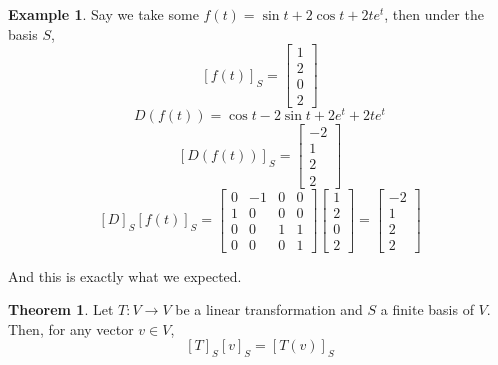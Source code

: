 \documentclass{report}
\theoremstyle{definition}
\newtheorem{_thm}{Theorem}[section]
\newtheorem{ex}{Example}[section]
\theoremstyle{remark}
\begin{document}
\begin{ex}
Say we take some $f(t)=\sin t+2\cos t+2te^t$, then under the basis $S$,
\[
[f(t)]_S=\begin{bmatrix}
1 \\ 2 \\ 0 \\ 2
\end{bmatrix}
\]
\[
D(f(t))=\cos t-2\sin t+2e^t+2te^t
\]
\[
[D(f(t))]_S=\begin{bmatrix}
-2 \\ 1 \\ 2 \\ 2
\end{bmatrix}
\]
\[
[D]_S[f(t)]_S=\begin{bmatrix}
0 & -1 & 0 & 0 \\
1 & 0 & 0 & 0 \\
0 & 0 & 1 & 1 \\
0 & 0 & 0 & 1
\end{bmatrix}
\begin{bmatrix}
1 \\ 2 \\ 0 \\ 2
\end{bmatrix}=
\begin{bmatrix}
-2 \\ 1 \\ 2 \\ 2
\end{bmatrix}
\]

And this is exactly what we expected.
\end{ex}

\begin{_thm}
Let $T:V\rightarrow V$ be a linear transformation and $S$ a finite basis of $V$.
Then, for any vector $v\in V$,
\[
[T]_S[v]_S=[T(v)]_S
\]
\end{_thm}
\end{document}
